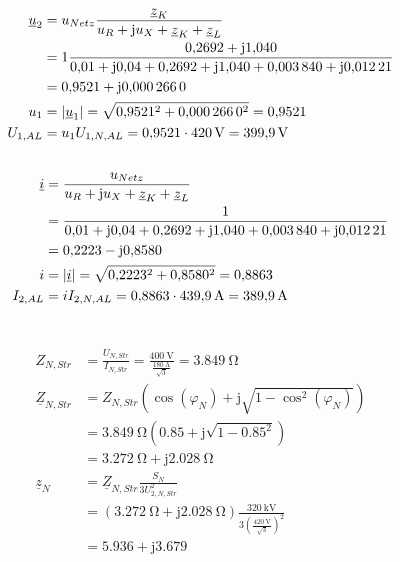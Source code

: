 \documentclass[11pt,a4paper]{scrartcl}
\DeclarePairedDelimiter{\abs}{\lvert}{\rvert}
\newcommand{\mybr}[1]{\left(#1\right)}
\renewcommand{\j}{\mathrm{j}}
\newcommand{\Z}{\underline{Z}}
\newcommand{\z}{\underline{z}}
\renewcommand{\u}{\underline{u}}
\renewcommand{\i}{\underline{i}}
\newcommand{\0}{_{\mybr{0}}}
\newcommand{\1}{_{\mybr{1}}}
\newcommand{\2}{_{\mybr{2}}}
\newcommand{\UPA}{U_{1,AL}}
\newcommand{\ISA}{I_{2,AL}}
\newcommand{\USNS}{U_{2,N,Str}}
\newcommand{\UPNA}{U_{1,N,AL}}
\newcommand{\ISNA}{I_{2,N,AL}}
\begin{document}
\subsection{}
\begin{align}
\u_2&=u_{Netz}\frac{\z_K}{u_R+\j u_X+\z_K+\z_L}\\
&=1\frac{\num{0.2692}+\j\num{1.040}}{\num{0.01}+\j\num{0.04}+\num{0.2692}+\j\num{1.040}+\num{0.003840}+\j\num{0.01221}}\\
&=\num{0.9521}+\j\num{0.0002660}\\
u_1&=\abs{\u_1}=\sqrt{\num{0.9521}^2+\num{0.0002660}^2}=\num{0.9521}\\
\UPA&=u_1\UPNA=\num{0.9521}\cdot\SI{420}{\volt}=\SI{399.9}{\volt}
\end{align}

\subsection{}
\begin{align}
\i&=\frac{u_{Netz}}{u_R+\j u_X+\z_K+\z_L}\\
&=\frac{1}{\num{0.01}+\j\num{0.04}+\num{0.2692}+\j\num{1.040}+\num{0.003840}+\j\num{0.01221}}\\
&=\num{0.2223}-\j\num{0.8580}\\
i&=\abs{\i}=\sqrt{\num{0.2223}^2+\num{0.8580}^2}=\num{0.8863}\\
\ISA&=i\ISNA=\num{0.8863}\cdot\SI{439.9}{\ampere}=\SI{389.9}{\ampere}
\end{align}

\section{}
\begin{align}
Z_{N,Str}&=\frac{U_{N,Str}}{I_{N,Str}}=\frac{\SI{400}{\volt}}{\frac{\SI{180}{\ampere}}{\sqrt{3}}}=\SI{3.849}{\ohm}\\
\Z_{N,Str}&=Z_{N,Str}\mybr{\cos\mybr{\varphi_N}+\j\sqrt{1-\cos^2\mybr{\varphi_N}}}\\
&=\SI{3.849}{\ohm}\mybr{\num{0.85}+\j\sqrt{1-\num{0.85}^2}}\\
&=\SI{3.272}{\ohm}+\j\SI{2.028}{\ohm}\\
\z_N&=\Z_{N,Str}\frac{S_N}{3\USNS^2}\\
&=\mybr{\SI{3.272}{\ohm}+\j\SI{2.028}{\ohm}}\frac{\SI{320}{\kilo\volt}}{3\mybr{\frac{\SI{420}{\volt}}{\sqrt{3}}}^2}\\
&=\num{5.936}+\j\num{3.679}
\end{align}
\end{document}
